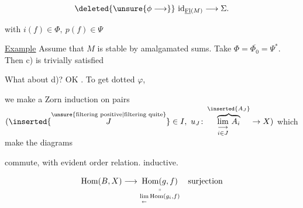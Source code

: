 \[
\deleted{\unsure{\phi\longrightarrow}}\ \mathrm{id}_{\underline{\mathrm{Fl}}(M)}\longrightarrow\Sigma.
\]


with $i(f)\in\Phi,\ p(f)\in\Psi$

\uline{Example} Assume that $M$ is stable by amalgamated sums. Take $\Phi=\overline{\Phi_0}=\Psi^*$. Then c)  is trivially satisfied

What about d)? OK . To get   dotted $\varphi$,


we make a Zorn induction on pairs $(\inserted{\overset{\text{\unsure{filtering positive|filtering quite}}}{J}}\in I,\ u_J\colon \overbrace{\underset{i\in J}{\underset{\longrightarrow}{\lim}}\ A_i}^{\inserted{A_J}}\to X)$ which make the diagrams


commute, with evident order relation.  inductive.

\[
 \mathrm{Hom}(B,X)\longrightarrow
 \underset{\underset{\leftarrow}{\lim}\,\mathrm{Hom}(g_i,f)}{\underset{\scriptscriptstyle\shortparallel}{\mathrm{Hom}(g,f)}}\quad\text{surjection}
\]
